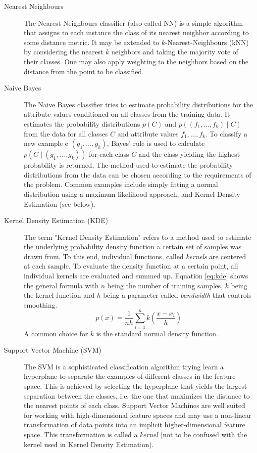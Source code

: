 \documentclass[
	ruledheaders=chapter,
	class=report,
	thesis={type=master, department=inf},
	accentcolor=1c,
	custommargins=true,
	marginpar=false,
	parskip=half-,
	fontsize=11pt,
]{tudapub}
\begin{document}
	\begin{description}
		\item[Nearest Neighbours] The Nearest Neighbours classifier (also called NN) is a simple algorithm that assigns to each instance the class of its nearest neighbor according to some distance metric. It may be extended to $k$-Nearest-Neighbours (kNN) by considering the nearest $k$ neighbors and taking the majority vote of their classes. One may also apply weighting to the neighbors based on the distance from the point to be classified.
		\item[Naive Bayes] The Naive Bayes classifier tries to estimate probability distributions for the attribute values conditioned on all classes from the training data. It estimates the probability distributions $p(C)$ and $p((f_1, ..., f_k) \mid C)$ from the data for all classes $C$ and attribute values $f_1, ..., f_k$. To classify a new example e $(g_1, ..., g_k)$, Bayes' rule is used to calculate $p(C \mid (g_1, ..., g_k))$ for each class $C$ and the class yielding the highest probability is returned. The method used to estimate the probability distributions from the data can be chosen according to the requirements of the problem. Common examples include simply fitting a normal distribution using a maximum likelihood approach, and Kernel Density Estimation (see below).
		\item[Kernel Density Estimation (KDE)] The term "Kernel Density Estimation" refers to a method used to estimate the underlying probability density function a certain set of samples was drawn from. To this end, individual functions, called \textit{kernels} are centered at each sample. To evaluate the density function at a certain point, all individual kernels are evaluated and summed up. Equation \ref{eq:kde} shows the general formula with $n$ being the number of training samples, $k$ being the kernel function and $h$ being a parameter called \textit{bandwidth} that controls smoothing.
		\begin{equation}
			\label{eq:kde}
			p(x) = \frac{1}{nh}\sum_{i = 1}^{n} k\left(\frac{x - x_i}{h}\right)
		\end{equation}
		A common choice for $k$ is the standard normal density function.
		\item[Support Vector Machine (SVM)] The SVM is a sophisticated classification algorithm trying learn a hyperplane to separate the examples of different classes in the feature space. This is achieved by selecting the hyperplane that yields the largest separation between the classes, i.e. the one that maximizes the distance to the nearest points of each class. Support Vector Machines are well suited for working with high-dimensional feature spaces and may use a non-linear transformation of data points into an implicit higher-dimensional feature space. This transformation is called a \textit{kernel} (not to be confused with the kernel used in Kernel Density Estimation). \cite{Boser1992,Cortes1995}
	\end{description}
\end{document}
